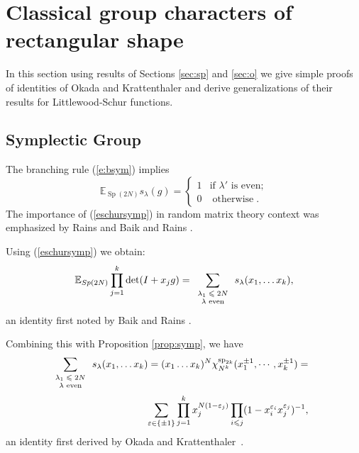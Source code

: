 \documentclass[11pt]{amsart}
\newcommand{\tmop}[1]{\ensuremath{\operatorname{#1}}}
\newcommand{\tmscript}[1]{\text{\scriptsize $#1$}}
\renewcommand{\sp}{{\rm sp}}
\begin{document}
\section{Classical group characters of rectangular shape}\label{rect}

In this section using results of Sections \ref{sec:sp} and
\ref{sec:o} we give simple proofs of identities of Okada
{\cite{ok}} and Krattenthaler {\cite{krat}} and derive
generalizations of their results for Littlewood-Schur functions.

\subsection{Symplectic Group}

The branching rule (\ref{e:bsym}) implies
\begin{equation}
  \label{eschursymp} \mathbb{E}_{\tmop{Sp} ( 2 N )} s_{\lambda} ( g ) =
  \left\{\begin{array}{ll}
    1 & \text{if $\lambda'$ is even} ;\\
    0 & \tmop{otherwise} .
  \end{array}\right.
\end{equation}
The importance of (\ref{eschursymp}) in random matrix theory
context was emphasized by Rains {\cite{Ra98}} and Baik and Rains
{\cite{BR02}}.

Using (\ref{eschursymp}) we obtain:
\begin{equation}
  \label{elaba} \mathbb{E}_{Sp ( 2 N )} \prod_{j = 1}^k \det ( I + x_j g ) =
  \sum_{\tmscript{\begin{array}{c}
    \lambda_1 \leqslant 2 N\\
    \text{$\lambda$ even}
  \end{array}}} s_{\lambda} ( x_1, \ldots x_k ),
\end{equation}
an identity first noted by Baik and Rains {\cite{BR02}}.

Combining this with Proposition \ref{prop:symp}, we have
\begin{eqnarray}
  \sum_{\tmscript{\begin{array}{c}
    \lambda_1 \leqslant 2 N\\
    \text{$\lambda$ even}
  \end{array}}} s_{\lambda} ( x_1, \ldots x_k ) = ( x_1 \ldots x_k )^N
\chi_{N^k}^{\sp_{2k}}( x_1^{\pm 1}, \cdots, x_k^{\pm 1} ) = &  &
  \nonumber\\
  \sum_{\varepsilon \in \{ \pm 1 \}} \prod_{j = 1}^k x_j^{N ( 1 -
  \varepsilon_j )} \prod_{i \leqslant j} ( 1 - x_i^{\varepsilon_i}
  x_j^{\varepsilon_j} )^{- 1}, &  &  \label{okrat1}
\end{eqnarray}
an identity first derived by Okada {\cite{ok}} and
Krattenthaler~{\cite{krat}}.
\end{document}
